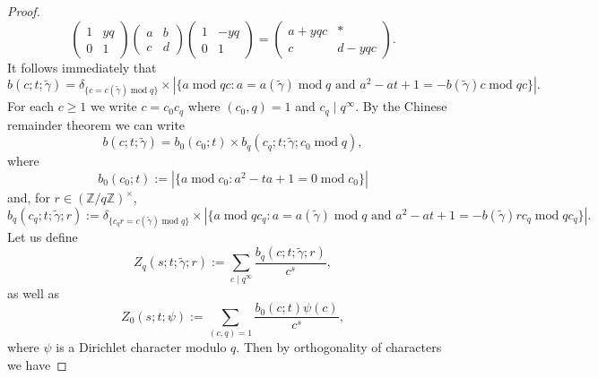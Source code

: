 \documentclass{article}
\theoremstyle{named}
\newcommand{\Z}{\mathbb{Z}}
\DeclareMathOperator{\modulo}{mod}
\begin{document}
\begin{proof}
\begin{equation*}
    \begin{pmatrix}
        1 & yq\\
        0 & 1
    \end{pmatrix}\begin{pmatrix}
        a & b\\
        c & d
    \end{pmatrix}\begin{pmatrix}
        1 & -yq\\
        0 & 1
    \end{pmatrix} = \begin{pmatrix}
        a + yqc & *\\
        c & d - yqc
    \end{pmatrix}.
\end{equation*}
It follows immediately that 
\begin{equation*}
  b(c; t; \widetilde{\gamma}) = \delta_{\{c = c(\widetilde{\gamma})\modulo q\}}\times |\{a \modulo qc: a = a(\widetilde{\gamma}) \modulo q \text{ and } a^2 - at + 1 = -b(\widetilde{\gamma})c \modulo qc\}|.
\end{equation*}
For each $c \geq 1$ we write $c = c_0 c_q$ where $(c_0, q) = 1$ and $c_q \mid q^\infty$. By the Chinese remainder theorem we can write
\begin{equation*}
    b(c; t; \widetilde{\gamma}) = b_0(c_0; t) \times b_q(c_q; t; \widetilde{\gamma}; c_0 \modulo q),
\end{equation*}
where 
\begin{equation*}
    b_0(c_0; t) := \left|\{a \modulo c_0 : a^2 -ta + 1 = 0 \modulo c_0\}\right|
\end{equation*}
and, for $r \in (\Z/q\Z)^\times$,
\begin{equation*}
    b_q(c_q; t; \widetilde{\gamma}; r) := \delta_{\{c_q r = c(\widetilde{\gamma}) \modulo q\}}\times \left|\{a \modulo q c_q: a = a(\widetilde{\gamma}) \modulo q \text{ and } a^2 - at + 1 = -b(\widetilde{\gamma})rc_q \modulo qc_q\}\right|.
\end{equation*}
Let us define 
\begin{equation*}
    Z_q(s; t; \widetilde{\gamma}; r) := \sum_{c \mid q^\infty} \frac{b_q(c; t; \widetilde{\gamma}; r)}{c^s},
\end{equation*}
as well as
\begin{equation*}
    Z_0(s; t; \psi) := \sum_{(c, q) = 1} \frac{b_0(c; t)\psi(c)}{c^s},
\end{equation*}
where $\psi$ is a Dirichlet character modulo $q$. Then by orthogonality of characters we have

\end{proof}
\end{document}
